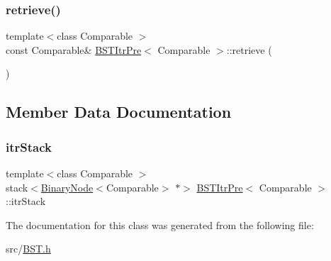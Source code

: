 \mbox{\label{classBSTItrPre_ace3c36566d09f71eff8807c9a4fff7fe}} 
\subsubsection{\texorpdfstring{retrieve()}{retrieve()}}
{\footnotesize\ttfamily template$<$class Comparable $>$ \\
const Comparable\& \hyperlink{classBSTItrPre}{B\+S\+T\+Itr\+Pre}$<$ Comparable $>$\+::retrieve (\begin{DoxyParamCaption}{ }\end{DoxyParamCaption})\hspace{0.3cm}{\ttfamily [inline]}}



\subsection{Member Data Documentation}
\mbox{\label{classBSTItrPre_a73e938d809acba06490472e7fc1bd6d3}} 
\subsubsection{\texorpdfstring{itr\+Stack}{itrStack}}
{\footnotesize\ttfamily template$<$class Comparable $>$ \\
stack$<$\hyperlink{classBinaryNode}{Binary\+Node}$<$Comparable$>$ $\ast$$>$ \hyperlink{classBSTItrPre}{B\+S\+T\+Itr\+Pre}$<$ Comparable $>$\+::itr\+Stack\hspace{0.3cm}{\ttfamily [private]}}



The documentation for this class was generated from the following file\+:\begin{DoxyCompactItemize}
\item 
src/\hyperlink{BST_8h}{B\+S\+T.\+h}\end{DoxyCompactItemize}
